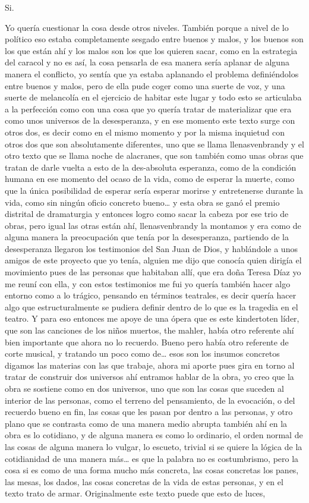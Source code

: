 Si.

Yo quería cuestionar la cosa desde otros niveles. También porque a nivel de lo político eso estaba completamente sesgado entre buenos y malos, y los buenos son los que están ahí y los malos son los que los quieren sacar, como en la estrategia del caracol y no es así, la cosa pensarla de esa manera sería aplanar de alguna manera el conflicto, yo sentía que ya estaba aplanando el problema definiéndolos entre buenos y malos, pero de ella pude coger como una suerte de voz, y una suerte de melancolía en el ejercicio de habitar este lugar y todo esto se articulaba a la perfección como con una cosa que yo quería tratar de materializar que era como unos universos de la desesperanza, y en ese momento este texto surge con otros dos, es decir como en el mismo momento y por la misma inquietud con otros dos que son absolutamente diferentes, uno que se llama llenasvenbrandy y el otro texto que se llama noche de alacranes, que son también como unas obras que tratan de darle vuelta a esto de la des-absoluta esperanza, como de la condición humana en ese momento del ocaso de la vida, como de esperar la muerte, como que la única posibilidad de esperar sería esperar morirse y entretenerse durante la vida, como sin ningún oficio concreto bueno… y esta obra se ganó el premio distrital de dramaturgia y entonces logro como sacar la cabeza por ese trio de obras, pero igual las otras están ahí, llenasvenbrandy la montamos y era como de alguna manera la preocupación que tenía por la desesperanza, partiendo de la desesperanza llegaron los testimonios del San Juan de Dios, y hablándole a unos amigos de este proyecto que yo tenía, alguien me dijo que conocía quien dirigía el movimiento pues de las personas que habitaban allí, que era doña Teresa Díaz yo me reuní con ella, y con estos testimonios me fui yo quería también hacer algo entorno como a lo trágico, pensando en términos teatrales, es decir quería hacer algo que estructuralmente se pudiera definir dentro de lo que es la tragedia en el teatro. Y para eso entonces me apoye de una ópera que es este kindertoten líder, que son las canciones de los niños muertos, the mahler, había otro referente ahí bien importante que ahora no lo recuerdo. Bueno pero había otro referente de corte musical, y tratando un poco como de… esos son los insumos concretos digamos las materias con las que trabaje, ahora mi aporte pues gira en torno al tratar de construir dos universos ahí entramos hablar de la obra, yo creo que la obra se sostiene como en dos universos, uno que son las cosas que suceden al interior de las personas, como el terreno del pensamiento, de la evocación, o del recuerdo bueno en fin, las cosas que les pasan por dentro a las personas, y otro plano que se contrasta como de una manera medio abrupta también ahí en la obra es lo cotidiano, y de alguna manera es como lo ordinario, el orden normal de las cosas de alguna manera lo vulgar, lo escueto, trivial si se quiere la lógica de la cotidianidad de una manera más… es que la palabra no es costumbrismo, pero la cosa si es como de una forma mucho más concreta, las cosas concretas los panes, las mesas, los dados, las cosas concretas de la vida de estas personas, y en el texto trato de armar. Originalmente este texto puede que esto de luces, 